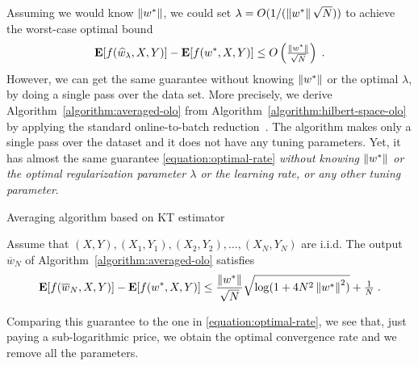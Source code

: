 Assuming we would know $\left\|{w^*}\right\|$, we could set $\lambda =
O(1/(\left\|{w^*}\right\| \sqrt{N}))$ to achieve the worst-case optimal bound
%
\begin{equation}
\label{equation:optimal-rate}
\operatorname*{\mathbf{E}}[f(\widehat{w}_\lambda,X,Y)] - \operatorname*{\mathbf{E}}[f(w^*,X,Y)] \le O\left(\tfrac{\left\|{w^*}\right\|}{\sqrt{N}}\right) \; .
\end{equation}
However, we can get the same guarantee without knowing $\left\|{w^*}\right\|$ or the
optimal $\lambda$, by doing a single pass over the data set. More precisely, we
derive Algorithm~\ref{algorithm:averaged-olo} from
Algorithm~\ref{algorithm:hilbert-space-olo} by applying the standard
online-to-batch reduction~\citep{Shalev-Shwartz-2011}.  The algorithm makes
only a single pass over the dataset and it does not have any tuning parameters.
Yet, it has almost the same guarantee \eqref{equation:optimal-rate}
\emph{without knowing $\left\|{w^*}\right\|$ or the optimal regularization parameter
$\lambda$ or the learning rate, or any other tuning parameter}.

\begin{algorithm}[t]
\caption{Averaging algorithm based on KT estimator \label{algorithm:averaged-olo}}
\begin{algorithmic}[1]
{
\ENDFOR
{}
}
\end{algorithmic}
\end{algorithm}
%
\begin{theorem}
Assume that $(X, Y), (X_1, Y_1), (X_2, Y_2), \dots, (X_N,Y_N)$ are i.i.d.  The
output $\overline{w}_N$ of Algorithm~\ref{algorithm:averaged-olo} satisfies
$$
\operatorname*{\mathbf{E}}[f(\overline{w}_N,X,Y)] - \operatorname*{\mathbf{E}}[f(w^*,X,Y)] \le \frac{\left\|{w^*}\right\|}{\sqrt{N}} \sqrt{\log(1+4 N^2 \left\|{w^*}\right\|^2)} + \tfrac{1}{N} \; .
$$
\end{theorem}
%
Comparing this guarantee to the one in \eqref{equation:optimal-rate}, we see
that, just paying a sub-logarithmic price, we obtain the optimal convergence
rate and we remove all the parameters.
